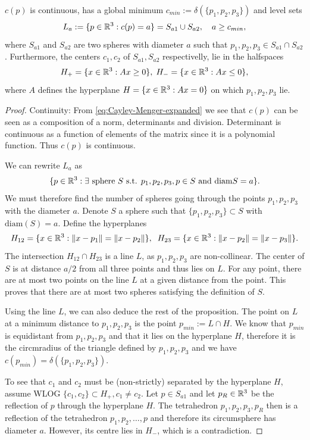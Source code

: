 \begin{lemma} $c(p)$ is continuous, has a global minimum $c_{min} := \delta(\{p_1,p_2,p_3\})$ and level sets 
	$$L_a := \{p \in {\mathbb R^3}: c(p)=a\} = S_{a1} \cup S_{a2}, \quad a \geq c_{min},$$ 
	where $S_{a1}$ and $S_{a2}$ are two spheres with diameter $a$ such that $p_1,p_2,p_3 \in S_{a1}\cap S_{a2}$. Furthermore, the centers $c_1, c_2$ of $S_{a1},S_{a2}$ respectivelly, lie in the halfspaces
$$H_+ = \{x \in {\mathbb R^3}: Ax \geq 0 \},\; H_- = \{x \in {\mathbb R^3}: Ax \leq 0\},$$
where $A$ defines the hyperplane $H=\{x\in{\mathbb R^3}: Ax = 0\}$ on which $p_1,p_2,p_3$ lie.
\end{lemma}
\begin{proof}
	Continuity: From \ref{eq:Cayley-Menger-expanded} we see that $c(p)$ can be seen as a composition of a norm, determinants and division. Determinant is continuous as a function of elements of the matrix since it is a polynomial function. Thus $c(p)$ is continuous.\newline

\noindent We can rewrite $L_a$ as
$$\{p \in {\mathbb R^3}: \exists \text{ sphere } S \text{ s.t. } p_1,p_2,p_3,p \in S \text{ and diam}S = a\}.$$
We must therefore find the number of spheres going through the points $p_1,p_2,p_3$ with the diameter $a$. Denote $S$ a sphere such that $\{p_1,p_2,p_3\}\subset S$ with $\mathrm{diam}(S)=a$. Define the hyperplanes
$$H_{12} = \{x\in{\mathbb R^3}: \|x-p_1\| = \|x-p_2\|\}, \;\; H_{23} = \{x\in{\mathbb R^3}: \|x-p_2\|=\|x-p_3\|\}.$$
The intersection $H_{12}\cap H_{23}$ is a line $L$, as $p_1,p_2,p_3$ are non-collinear.  The center of $S$ is at distance $a/2$ from all three points and thus lies on $L$. For any point, there are at most two points on the line $L$ at a given distance from the point. This proves that there are at most two spheres satisfying the definition of $S$.

Using the line $L$, we can also deduce the rest of the proposition. The point on $L$ at a minimum distance to $p_1,p_2,p_3$ is the point $p_{min}:=L\cap H$. We know that $p_{min}$ is equidistant from $p_1,p_2,p_3$ and that it lies on the hyperplane $H$, therefore it is the circmradius of the triangle defined by $p_1,p_2,p_3$ and we have $c(p_{min}) = \delta(\{p_1,p_2,p_3\})$.  

To see that $c_1$ and $c_2$ must be (non-strictly) separated by the hyperplane $H$, assume WLOG $\{c_1,c_2\}\subset H_+, c_1\neq c_2$. Let $p \in S_{a1}$ and let  $p_R\in {\mathbb R^3}$ be the reflection of $p$ through the hyperplane $H$. The tetrahedron $p_1,p_2,p_3,p_R$ then is a reflection of the tetrahedron $p_1,p_2,\dots, p$ and therefore its circumsphere has diameter $a$. However, its centre lies in $H_-$, which is a contradiction. 
\end{proof}

